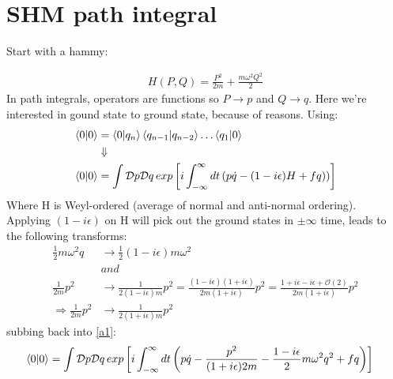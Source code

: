 \documentclass{article}
\begin{document}
\section*{SHM path integral}%
\label{sec:shm_path_integral}

Start with a hammy:

\begin{align}
	H \left(P,Q\right) = \frac{P^2}{2m} + \frac{m\omega^2Q^2}{2}
\end{align}
In path integrals, operators are functions so $P \rightarrow p$ and $Q \rightarrow q$. Here we're interested in gound state to ground state, because of reasons. Using:
\begin{align}
	\braket{0}{0} &= \braket{0}{q_n}\braket{q_{n-1}}{q_{n-2}}\ldots \braket{q_1}{0} \\
		      &\Downarrow \nonumber \\
	\braket{0}{0} &= \int \mathcal{D}p \mathcal{D}q \,exp \left[i \int_{-\infty}^{\infty}dt \left(p\dot{q} - \left(1-i\epsilon)H + fq \right)\right)\right] \label{a1}
\end{align}
Where H is Weyl-ordered (average of normal and anti-normal ordering).\\
Applying $(1-i\epsilon)$ on H will pick out the ground states in $\pm\infty$ time, leads to the following transforms:
\begin{align}
	\frac{1}{2}m\omega^2q &\rightarrow \frac{1}{2}(1-i\epsilon)m\omega^2 \\
		  & and \\
	\frac{1}{2m}p^2 &\rightarrow \frac{1}{2(1-i\epsilon)m}p^2 = \frac{(1-i\epsilon)(1+i\epsilon)}{2m(1+i\epsilon)}p^2 = \frac{1+i\epsilon-i\epsilon+\mathcal{O}(2)}{2m(1+i\epsilon)}p^2 \\
\Rightarrow \frac{1}{2m}p^2 &\rightarrow \frac{1}{2(1+i\epsilon)m}p^2
\end{align}
subbing back into \ref{a1}:
\begin{align}
	\braket{0}{0} &= \int \mathcal{D}p \mathcal{D}q \,exp \left[i \int_{-\infty}^{\infty}dt \left(p\dot{q} - \frac{p^2}{(1+i\epsilon)2m} - \frac{1-i\epsilon}{2} m\omega^2q^2 + fq \right)\right]
\end{align}
\end{document}
